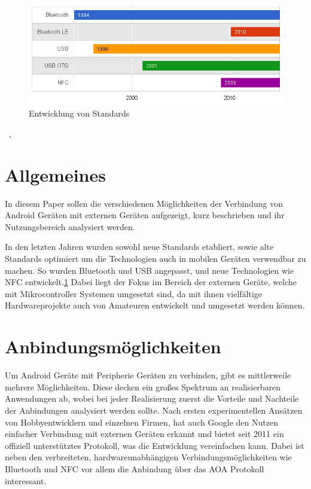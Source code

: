 \documentclass[12pt,journal,compsoc]{IEEEtran}
\begin{document}
\begin{figure}
	\centering
\includegraphics[width=\linewidth,angle=0]{media/chart.png}
\caption{Entwicklung von Standards}
\label{gchart}
\end{figure}




\hfill{\the\day~\Monat, \the\year  }

\section{Allgemeines}
In diesem Paper sollen die verschiedenen Möglichkeiten der Verbindung von Android Geräten mit externen Geräten aufgezeigt, kurz beschrieben und ihr Nutzungsbereich analysiert werden.

In den letzten Jahren wurden sowohl neue Standards etabliert, sowie alte Standards optimiert um die Technologien auch in mobilen Geräten verwendbar zu machen.
So wurden Bluetooth und USB angepasst, und neue Technologien wie NFC entwickelt.\ref{gchart}
Dabei liegt der Fokus im Bereich der externen Geräte, welche mit Mikrocontroller Systemen umgesetzt sind, da mit ihnen vielfältige Hardwareprojekte auch von Amateuren entwickelt und umgesetzt werden können.

\section{Anbindungsmöglichkeiten}
Um Android Geräte mit Peripherie Geräten zu verbinden, gibt es mittlerweile mehrere Möglichkeiten.
Diese decken ein großes Spektrum an realisierbaren Anwendungen ab, wobei bei jeder Realisierung zuerst die Vorteile und Nachteile der Anbindungen analysiert werden sollte.
Nach ersten experimentellen Ansätzen von Hobbyentwicklern und einzelnen Firmen, hat auch Google den Nutzen einfacher Verbindung mit externen Geräten 
erkannt und bietet seit 2011 ein offiziell unterstütztes Protokoll, was die Entwicklung vereinfachen kann.
Dabei ist neben den verbreiteten, hardwareunabhängigen Verbindungsmöglichkeiten wie Bluetooth und NFC vor allem die Anbindung über das AOA Protokoll interessant. 
\end{document}
